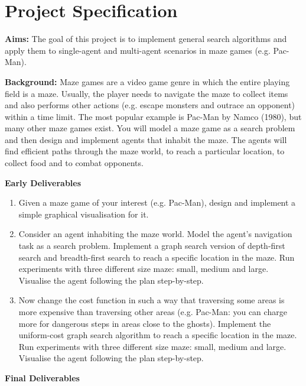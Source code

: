 \documentclass[]{final_report}
\begin{document}
\chapter*{Project Specification}

\begin{minipage}{\textwidth}
\textbf{Aims:} The goal of this project is to implement general search algorithms and apply them to single-agent and multi-agent scenarios in maze games (e.g. Pac-Man).

\textbf{Background:} Maze games are a video game genre in which the entire playing field is a maze. Usually, the player needs to navigate the maze to collect items and also performs other actions (e.g. escape monsters and outrace an opponent) within a time limit. The most popular example is Pac-Man by Namco (1980), but many other maze games exist. You will model a maze game as a search problem and then design and implement agents that inhabit the maze. The agents will find efficient paths through the maze world, to reach a particular location, to collect food and to combat opponents.

\textbf{Early Deliverables}

\begin{enumerate}
    \item Given a maze game of your interest (e.g. Pac-Man), design and implement a simple graphical visualisation for it.
    \item Consider an agent inhabiting the maze world. Model the agent's navigation task as a search problem. Implement a graph search version of depth-first search and breadth-first search to reach a specific location in the maze. Run experiments with three different size maze: small, medium and large. Visualise the agent following the plan step-by-step.
    \item Now change the cost function in such a way that traversing some areas is more expensive than traversing other areas (e.g. Pac-Man: you can charge more for dangerous steps in areas close to the ghosts). Implement the uniform-cost graph search algorithm to reach a specific location in the maze. Run experiments with three different size maze: small, medium and large. Visualise the agent following the plan step-by-step.
\end{enumerate}

\textbf{Final Deliverables}


\end{minipage}
\end{document}
